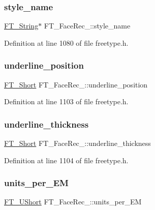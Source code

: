 \subsubsection{\texorpdfstring{style\_name}{style\_name}}
{\footnotesize\ttfamily \mbox{\hyperlink{fttypes_8h_a9846214585359eb2ba6bbb0e6de30639}{F\+T\+\_\+\+String}}$\ast$ F\+T\+\_\+\+Face\+Rec\+\_\+\+::style\+\_\+name}



Definition at line 1080 of file freetype.\+h.

\mbox{\label{struct_f_t___face_rec___ac4f899e32a37a89794d6c160a26937e1}} 
\subsubsection{\texorpdfstring{underline\_position}{underline\_position}}
{\footnotesize\ttfamily \mbox{\hyperlink{fttypes_8h_aa7279be89046a2563cd3d4d6651fbdcf}{F\+T\+\_\+\+Short}} F\+T\+\_\+\+Face\+Rec\+\_\+\+::underline\+\_\+position}



Definition at line 1103 of file freetype.\+h.

\mbox{\label{struct_f_t___face_rec___a61adda036bab17c419c358a31693e680}} 
\subsubsection{\texorpdfstring{underline\_thickness}{underline\_thickness}}
{\footnotesize\ttfamily \mbox{\hyperlink{fttypes_8h_aa7279be89046a2563cd3d4d6651fbdcf}{F\+T\+\_\+\+Short}} F\+T\+\_\+\+Face\+Rec\+\_\+\+::underline\+\_\+thickness}



Definition at line 1104 of file freetype.\+h.

\mbox{\label{struct_f_t___face_rec___a8fde3c2d9b5fab717d8398b4196dd041}} 
\subsubsection{\texorpdfstring{units\_per\_EM}{units\_per\_EM}}
{\footnotesize\ttfamily \mbox{\hyperlink{fttypes_8h_a937f6c17cf5ffd09086d8610c37b9f58}{F\+T\+\_\+\+U\+Short}} F\+T\+\_\+\+Face\+Rec\+\_\+\+::units\+\_\+per\+\_\+\+EM}



